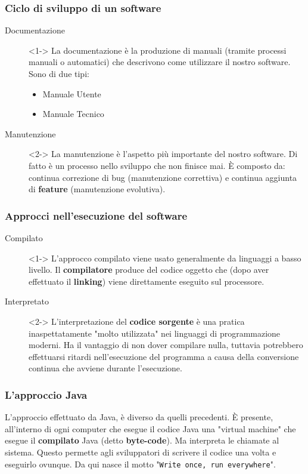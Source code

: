 \documentclass{beamer}
\begin{document}
    \begin{frame}
        \frametitle{Ciclo di sviluppo di un software}
    
        \begin{description}
            \item[Documentazione]<1-> La documentazione è la produzione di manuali (tramite processi manuali o automatici) che descrivono come utilizzare il nostro software. Sono di due tipi:
            \begin{itemize}
                \item Manuale Utente
                \item Manuale Tecnico
            \end{itemize}
            \item[Manutenzione]<2-> La manutenzione è l'aspetto più importante del nostro software. Di fatto è un processo nello sviluppo che non finisce mai. È composto da: continua correzione di bug (manutenzione correttiva) e continua aggiunta di \textbf{feature} (manutenzione evolutiva).
        \end{description}
    \end{frame}

    \begin{frame}
        \frametitle{Approcci nell'esecuzione del software}
    
        \begin{description}
            \item[Compilato]<1-> L'approcco compilato viene usato generalmente da linguaggi a basso livello. Il \textbf{compilatore} produce del codice oggetto che (dopo aver effettuato il \textbf{linking}) viene direttamente eseguito sul processore.
            \item[Interpretato]<2-> L'interpretazione del \textbf{codice sorgente} è una pratica inaspettatamente "molto utilizzata" nei linguaggi di programmazione moderni. Ha il vantaggio di non dover compilare nulla, tuttavia potrebbero effettuarsi ritardi nell'esecuzione del programma a causa della conversione continua che avviene durante l'esecuzione.
        \end{description}
    
    \end{frame}

    \begin{frame}
        \frametitle{L'approccio Java}
    
        L'approccio effettuato da Java, è diverso da quelli precedenti. È presente, all'interno di ogni computer che esegue il codice Java una "virtual machine" che esegue il \textbf{compilato} Java (detto \textbf{byte-code}). Ma interpreta le chiamate al sistema. Questo permette agli sviluppatori di scrivere il codice una volta e eseguirlo ovunque. Da qui nasce il motto "\texttt{Write once, run everywhere}".
        
    \end{frame}
\end{document}
